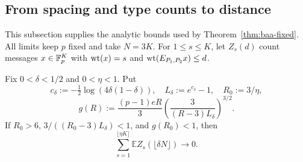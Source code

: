 \subsection{From spacing and type counts to distance}

This subsection supplies the analytic bounds used by
Theorem~\ref{thm:baa-fixed}. All limits keep $p$ fixed and take $N=3K$.
For $1\le s\le K$, let $Z_s(d)$ count messages $x\in\mathbb F_p^K$ with
$\operatorname{wt}(x)=s$ and $\operatorname{wt}(E_{P_1,P_2}x)\le d$.

\begin{lemma}\label{lem:baa-sparse}
Fix $0<\delta<1/2$ and $0<\eta<1$. Put
\[
 c_\delta:=-\tfrac12\log(4\delta(1-\delta)),\quad
 L_\delta:=e^{c_\delta}-1,\quad R_0:=3/\eta,
\]
\[
 g(R):=\frac{(p-1)eR}{3}
             \left(\frac{3}{(R-3)L_\delta}\right)^{3/2}.
\]
If $R_0>6$, $3/((R_0-3)L_\delta)<1$, and $g(R_0)<1$, then
\[
 \sum_{s=1}^{\lfloor\eta K\rfloor}
       \mathbb E Z_s(\lfloor\delta N\rfloor)\longrightarrow0.
\]
\end{lemma}
